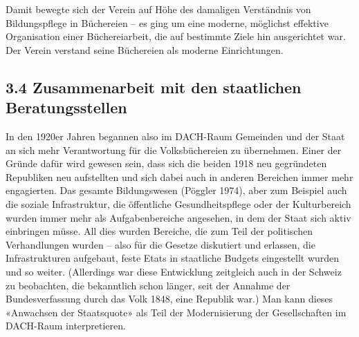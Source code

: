 \documentclass[a4paper,
fontsize=11pt,
oneside,
numbers=noperiodatend,
parskip=half-,
bibliography=totoc,
final
]{scrartcl}
\begin{document}
Damit bewegte sich der Verein auf Höhe des damaligen Verständnis von
Bildungspflege in Büchereien -- es ging um eine moderne, möglichst
effektive Organisation einer Büchereiarbeit, die auf bestimmte Ziele hin
ausgerichtet war. Der Verein verstand seine Büchereien als moderne
Einrichtungen.

\hypertarget{zusammenarbeit-mit-den-staatlichen-beratungsstellen}{%
\subsection{3.4 Zusammenarbeit mit den staatlichen
Beratungsstellen}\label{zusammenarbeit-mit-den-staatlichen-beratungsstellen}}

In den 1920er Jahren begannen also im DACH-Raum Gemeinden und der Staat
an sich mehr Verantwortung für die Volksbüchereien zu übernehmen. Einer
der Gründe dafür wird gewesen sein, dass sich die beiden 1918 neu
gegründeten Republiken neu aufstellten und sich dabei auch in anderen
Bereichen immer mehr engagierten. Das gesamte Bildungswesen (Pöggler
1974), aber zum Beispiel auch die soziale Infrastruktur, die öffentliche
Gesundheitspflege oder der Kulturbereich wurden immer mehr als
Aufgabenbereiche angesehen, in dem der Staat sich aktiv einbringen
müsse. All dies wurden Bereiche, die zum Teil der politischen
Verhandlungen wurden -- also für die Gesetze diskutiert und erlassen,
die Infrastrukturen aufgebaut, feste Etats in staatliche Budgets
eingestellt wurden und so weiter. (Allerdings war diese Entwicklung
zeitgleich auch in der Schweiz zu beobachten, die bekanntlich schon
länger, seit der Annahme der Bundesverfassung durch das Volk 1848, eine
Republik war.) Man kann dieses «Anwachsen der Staatsquote» als Teil der
Modernisierung der Gesellschaften im DACH-Raum interpretieren.
\end{document}
